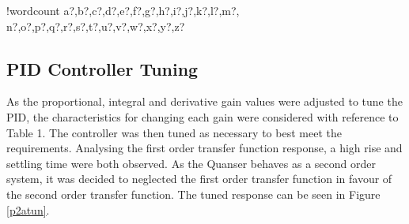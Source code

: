 \documentclass[11pt]{article}
\newcounter{words}
\newenvironment{counted}{%
  \setcounter{words}{0}
  \SearchList!{wordcount}{\stepcounter{words}}
    {a?,b?,c?,d?,e?,f?,g?,h?,i?,j?,k?,l?,m?,
    n?,o?,p?,q?,r?,s?,t?,u?,v?,w?,x?,y?,z?}
  \UndoBoundary{'}
  \SearchOrder{p;}}{%
  \StopSearching}
\begin{document}
\begin{counted}
\subsection{PID Controller Tuning}\label{pid-controller-tuning}

As the proportional, integral and derivative gain values were adjusted
to tune the PID, the characteristics for changing each gain were
considered with reference to Table 1. The controller was then tuned as
necessary to best meet the requirements. Analysing the first order
transfer function response, a high rise and settling time were both
observed. As the Quanser behaves as a second order system, it was
decided to neglected the first order transfer function in favour of the
second order transfer function. The tuned response can be seen in Figure
\ref{p2atun}.


\end{counted}
\end{document}
